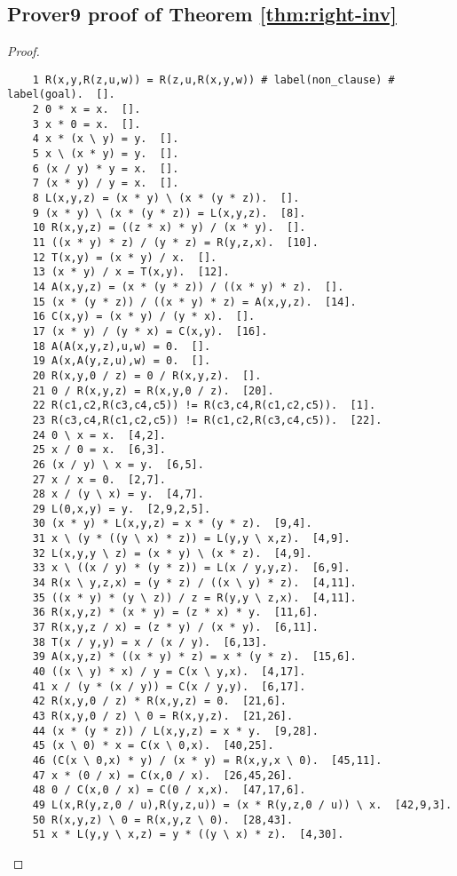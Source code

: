 \documentclass[12pt, twoside, openright]{report}
\theoremstyle{definition}
\begin{document}
\subsection{Prover9 proof of Theorem \ref{thm:right-inv}}
\begin{proof}\label{appendix:right-inv}
  \begin{lstlisting} 
    1 R(x,y,R(z,u,w)) = R(z,u,R(x,y,w)) # label(non_clause) # label(goal).  [].
    2 0 * x = x.  [].
    3 x * 0 = x.  [].
    4 x * (x \ y) = y.  [].
    5 x \ (x * y) = y.  [].
    6 (x / y) * y = x.  [].
    7 (x * y) / y = x.  [].
    8 L(x,y,z) = (x * y) \ (x * (y * z)).  [].
    9 (x * y) \ (x * (y * z)) = L(x,y,z).  [8].
    10 R(x,y,z) = ((z * x) * y) / (x * y).  [].
    11 ((x * y) * z) / (y * z) = R(y,z,x).  [10].
    12 T(x,y) = (x * y) / x.  [].
    13 (x * y) / x = T(x,y).  [12].
    14 A(x,y,z) = (x * (y * z)) / ((x * y) * z).  [].
    15 (x * (y * z)) / ((x * y) * z) = A(x,y,z).  [14].
    16 C(x,y) = (x * y) / (y * x).  [].
    17 (x * y) / (y * x) = C(x,y).  [16].
    18 A(A(x,y,z),u,w) = 0.  [].
    19 A(x,A(y,z,u),w) = 0.  [].
    20 R(x,y,0 / z) = 0 / R(x,y,z).  [].
    21 0 / R(x,y,z) = R(x,y,0 / z).  [20].
    22 R(c1,c2,R(c3,c4,c5)) != R(c3,c4,R(c1,c2,c5)).  [1].
    23 R(c3,c4,R(c1,c2,c5)) != R(c1,c2,R(c3,c4,c5)).  [22].
    24 0 \ x = x.  [4,2].
    25 x / 0 = x.  [6,3].
    26 (x / y) \ x = y.  [6,5].
    27 x / x = 0.  [2,7].
    28 x / (y \ x) = y.  [4,7].
    29 L(0,x,y) = y.  [2,9,2,5].
    30 (x * y) * L(x,y,z) = x * (y * z).  [9,4].
    31 x \ (y * ((y \ x) * z)) = L(y,y \ x,z).  [4,9].
    32 L(x,y,y \ z) = (x * y) \ (x * z).  [4,9].
    33 x \ ((x / y) * (y * z)) = L(x / y,y,z).  [6,9].
    34 R(x \ y,z,x) = (y * z) / ((x \ y) * z).  [4,11].
    35 ((x * y) * (y \ z)) / z = R(y,y \ z,x).  [4,11].
    36 R(x,y,z) * (x * y) = (z * x) * y.  [11,6].
    37 R(x,y,z / x) = (z * y) / (x * y).  [6,11].
    38 T(x / y,y) = x / (x / y).  [6,13].
    39 A(x,y,z) * ((x * y) * z) = x * (y * z).  [15,6].
    40 ((x \ y) * x) / y = C(x \ y,x).  [4,17].
    41 x / (y * (x / y)) = C(x / y,y).  [6,17].
    42 R(x,y,0 / z) * R(x,y,z) = 0.  [21,6].
    43 R(x,y,0 / z) \ 0 = R(x,y,z).  [21,26].
    44 (x * (y * z)) / L(x,y,z) = x * y.  [9,28].
    45 (x \ 0) * x = C(x \ 0,x).  [40,25].
    46 (C(x \ 0,x) * y) / (x * y) = R(x,y,x \ 0).  [45,11].
    47 x * (0 / x) = C(x,0 / x).  [26,45,26].
    48 0 / C(x,0 / x) = C(0 / x,x).  [47,17,6].
    49 L(x,R(y,z,0 / u),R(y,z,u)) = (x * R(y,z,0 / u)) \ x.  [42,9,3].
    50 R(x,y,z) \ 0 = R(x,y,z \ 0).  [28,43].
    51 x * L(y,y \ x,z) = y * ((y \ x) * z).  [4,30].

\end{lstlisting}
\end{proof}
\end{document}
